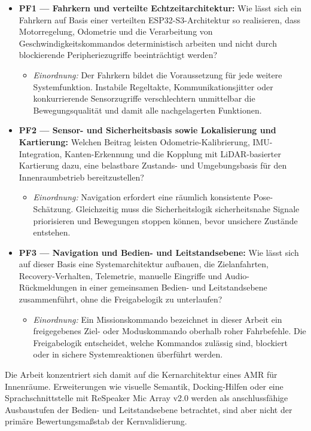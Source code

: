 \begin{itemize}
  \item \textbf{PF1 — Fahrkern und verteilte Echtzeitarchitektur:} Wie lässt sich ein Fahrkern auf Basis einer verteilten ESP32-S3-Architektur so realisieren, dass Motorregelung, Odometrie und die Verarbeitung von Geschwindigkeitskommandos deterministisch arbeiten und nicht durch blockierende Peripheriezugriffe beeinträchtigt werden?
  \begin{itemize}
    \item \textit{Einordnung:} Der Fahrkern bildet die Voraussetzung für jede weitere Systemfunktion. Instabile Regeltakte, Kommunikationsjitter oder konkurrierende Sensorzugriffe verschlechtern unmittelbar die Bewegungsqualität und damit alle nachgelagerten Funktionen.
  \end{itemize}

  \item \textbf{PF2 — Sensor- und Sicherheitsbasis sowie Lokalisierung und Kartierung:} Welchen Beitrag leisten Odometrie-Kalibrierung, IMU-Integration, Kanten-Erkennung und die Kopplung mit LiDAR-basierter Kartierung dazu, eine belastbare Zustands- und Umgebungsbasis für den Innenraumbetrieb bereitzustellen?
  \begin{itemize}
    \item \textit{Einordnung:} Navigation erfordert eine räumlich konsistente Pose-Schätzung. Gleichzeitig muss die Sicherheitslogik sicherheitsnahe Signale priorisieren und Bewegungen stoppen können, bevor unsichere Zustände entstehen.
  \end{itemize}

  \item \textbf{PF3 — Navigation und Bedien- und Leitstandsebene:} Wie lässt sich auf dieser Basis eine Systemarchitektur aufbauen, die Zielanfahrten, Recovery-Verhalten, Telemetrie, manuelle Eingriffe und Audio-Rückmeldungen in einer gemeinsamen Bedien- und Leitstandsebene zusammenführt, ohne die Freigabelogik zu unterlaufen?
  \begin{itemize}
    \item \textit{Einordnung:} Ein Missionskommando bezeichnet in dieser Arbeit ein freigegebenes Ziel- oder Moduskommando oberhalb roher Fahrbefehle. Die Freigabelogik entscheidet, welche Kommandos zulässig sind, blockiert oder in sichere Systemreaktionen überführt werden.
  \end{itemize}
\end{itemize}

Die Arbeit konzentriert sich damit auf die Kernarchitektur eines AMR für Innenräume. Erweiterungen wie visuelle Semantik, Docking-Hilfen oder eine Sprachschnittstelle mit ReSpeaker Mic Array v2.0 werden als anschlussfähige Ausbaustufen der Bedien- und Leitstandsebene betrachtet, sind aber nicht der primäre Bewertungsmaßstab der Kernvalidierung.

